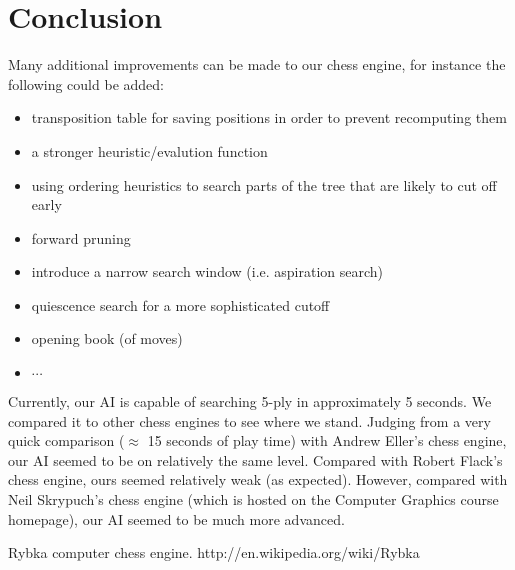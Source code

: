\documentclass[11pt,letterpaper,twocolumn]{article}
\begin{document}
\section{Conclusion}
Many additional improvements can be made to our chess engine, for instance the following could be added:
\begin{itemize}
\item transposition table for saving positions in order to prevent recomputing them
\item a stronger heuristic/evalution function
\item using ordering heuristics to search parts of the tree that are likely to cut off early
\item forward pruning
\item introduce a narrow search window (i.e. aspiration search)
\item quiescence search for a more sophisticated cutoff
\item opening book (of moves)
\item $\cdots$
\end{itemize}
Currently, our AI is capable of searching 5-ply in approximately 5 seconds. We compared it to other chess engines to see where we stand.
Judging from a very quick comparison ($\approx$ 15 seconds of play time) with Andrew Eller's chess engine, our AI seemed to be on relatively the same level.
Compared with Robert Flack's chess engine, ours seemed relatively weak (as expected). However, compared with Neil Skrypuch's chess engine (which is hosted on
the Computer Graphics course homepage), our AI seemed to be much more advanced.

\begin{thebibliography}{1} %

	  Rybka computer chess engine. http://en.wikipedia.org/wiki/Rybka

\end{thebibliography}
\end{document}
